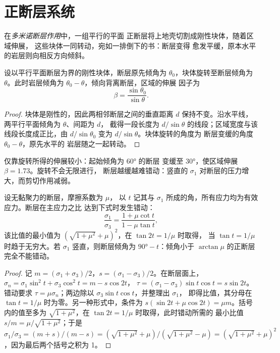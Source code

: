 \section{正断层系统}\label{sec:b3:extension-strike-slip:faults}

\begin{definition}[多米诺断层作用]\label{def:b3:extension-strike-slip:domino}
在\emph{多米诺断层作用}中，一组平行的平面
正断层将上地壳切割成刚性块体，随着区域伸展，
这些块体一同转动，宛如一排倒下的书：断层变得
愈发平缓，原本水平的岩层则向相反方向倾斜。
\end{definition}

\begin{theorem}[多米诺式伸展]\label{thm:b3:extension-strike-slip:domino}
设以平行平面断层为界的刚性块体，断层原先倾角为
$\theta_0$，块体旋转至断层倾角为 $\theta$。此时岩层倾角为 $\theta_0
- \theta$，倾向背离断层，区域的伸展
因子为
\[
  \beta = \frac{\sin\theta_0}{\sin\theta} .
\]
\end{theorem}

\begin{proof}
块体是刚性的，因此两相邻断层之间的垂直距离 $d$
保持不变。沿水平线，两平行平面倾角为 $\theta$、间距为 $d$，
截得一段长度为 $d/\sin
\theta$ 的线段；区域宽度与该线段长度成正比，由
$d/\sin\theta_0$ 变为 $d/\sin\theta$。块体旋转的角度为
断层变缓的角度 $\theta_0 - \theta$，原先水平的
岩层随之一起转动。
\end{proof}

仅靠旋转所得的伸展较小：起始倾角为 \ang{60} 的断层
变缓至 \ang{30}，使区域伸展 $\beta = 1.73$。旋转不会无限进行，
断层越缓越难错动：竖直的
$\sigma_1$ 对断层的压力增大，而剪切作用减弱。

\begin{proposition}[正断层的摩擦锁定]\label{prop:b3:extension-strike-slip:lockup}
设无黏聚力的断层，摩擦系数为 $\mu$，
以 $t$ 记其与 $\sigma_1$ 所成的角，所有应力均为有效应力。断层在主应力之比
达到下式时发生错动：
\[
  \frac{\sigma_1}{\sigma_3} = \frac{1 + \mu\cot t}{1 - \mu\tan t} ,
\]
该比值的最小值为 $(\sqrt{1 + \mu^2} + \mu)^2$，在 $\tan2t = 1/\mu$ 时取得，
当 $\tan t = 1/\mu$ 时趋于无穷大。若 $\sigma_1$ 竖直，则断层倾角为
$\ang{90} - t$：倾角小于 $\arctan\mu$ 的正断层
完全不能错动。
\end{proposition}

\begin{proof}
记 $m = (\sigma_1 + \sigma_3)/2$，$s = (\sigma_1 - \sigma_3)/2$。在断层面上，
$\sigma_n = \sigma_1\sin^2t + \sigma_3\cos^2t = m - s\cos2t$，
$\tau = (\sigma_1 - \sigma_3)\sin t\cos t = s\sin2t$。错动要求 $\tau =
\mu\sigma_n$；两边除以 $\sigma_3\sin t\cos t$，并整理出 $\sigma_1$，
即得比值，其分母在 $\tan t = 1/\mu$ 时为零。另一种形式中，条件为
$s(\sin2t + \mu\cos2t) = \mu m$。括号内的值至多为
$\sqrt{1 + \mu^2}$，在 $\tan2t = 1/\mu$ 时取得，此时错动所需的
最小比值 $s/m = \mu/\sqrt{1 + \mu^2}$；于是 $\sigma_1/\sigma_3 = (m + s)/(m - s) =
(\sqrt{1 + \mu^2} + \mu)/(\sqrt{1 + \mu^2} - \mu) = (\sqrt{1 + \mu^2} +
\mu)^2$，因为最后两个括号之积为 1。
\end{proof}

